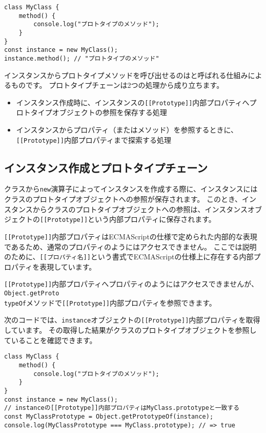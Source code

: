 \begin{lstlisting}
class MyClass {
    method() {
        console.log("プロトタイプのメソッド");
    }
}
const instance = new MyClass();
instance.method(); // "プロトタイプのメソッド"
\end{lstlisting}

インスタンスからプロトタイプメソッドを呼び出せるのは\textbf{}と呼ばれる仕組みによるものです。
プロトタイプチェーンは2つの処理から成り立ちます。

\begin{itemize}
\item
  インスタンス作成時に、インスタンスの\texttt{[[Prototype]]}内部プロパティへプロトタイプオブジェクトの参照を保存する処理
\item
  インスタンスからプロパティ（またはメソッド）を参照するときに、\texttt{[[Prototype]]}内部プロパティまで探索する処理
\end{itemize}

\hypertarget{write-prototype-chain}{%
\subsection{インスタンス作成とプロトタイプチェーン}\label{write-prototype-chain}}

クラスから\texttt{new}演算子によってインスタンスを作成する際に、インスタンスにはクラスのプロトタイプオブジェクトへの参照が保存されます。
このとき、インスタンスからクラスのプロトタイプオブジェクトへの参照は、インスタンスオブジェクトの\texttt{[[Prototype]]}という内部プロパティに保存されます。

\texttt{[[Prototype]]}内部プロパティはECMAScriptの仕様で定められた内部的な表現であるため、通常のプロパティのようにはアクセスできません。
ここでは説明のために、\texttt{[[プロパティ名]]}という書式でECMAScriptの仕様上に存在する内部プロパティを表現しています。

\texttt{[[Prototype]]}内部プロパティへプロパティのようにはアクセスできませんが、\texttt{Object.getProto\\typeOf}メソッドで\texttt{[[Prototype]]}内部プロパティを参照できます。

次のコードでは、\texttt{instance}オブジェクトの\texttt{[[Prototype]]}内部プロパティを取得しています。
その取得した結果がクラスのプロトタイプオブジェクトを参照していることを確認できます。

\begin{lstlisting}
class MyClass {
    method() {
        console.log("プロトタイプのメソッド");
    }
}
const instance = new MyClass();
// instanceの[[Prototype]]内部プロパティはMyClass.prototypeと一致する
const MyClassPrototype = Object.getPrototypeOf(instance);
console.log(MyClassPrototype === MyClass.prototype); // => true
\end{lstlisting}

